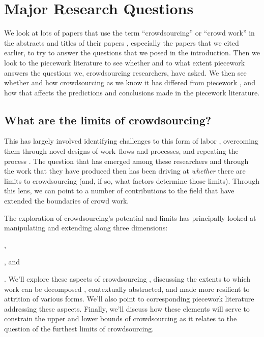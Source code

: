 \documentclass[trackingWork]{subfiles}
\begin{document}
\section{Major Research Questions}



We look at lots of papers that use the term ``crowdsourcing'' or ``crowd work''
in the abstracts and titles of their papers%
, especially the papers that we cited earlier, to try
to answer the questions that we posed in the introduction.
Then we look to the piecework literature to see whether and to what extent
piecework answers the questions we, crowdsourcing researchers, have asked.
We then see whether and how crowdsourcing as we know it has differed from piecework%
, and how that affects the predictions and conclusions made in the piecework literature.


\subsection{What are the limits of crowdsourcing?}
This has largely involved
  identifying challenges to this form of labor%
,   overcoming them through novel designs of work--flows and processes, and
  repeating the process
\cite[e.g.][]{bernsteinSoylent,foundry,crowdForgeKittur}.
The question that has emerged
among these researchers and
through the work that they have produced then
has been driving at \textit{whether} there are limits to crowdsourcing
(and, if so, what factors determine those limits).
Through this lens, we can point to
a number of contributions to the field that have extended the boundaries of crowd work.

The exploration of crowdsourcing's potential and limits has principally looked at
manipulating and extending along three dimensions:
\begin{inlinelist}
  \item {}%
,   \item {}, and
  \item {}
\end{inlinelist}.
We'll explore these aspects of crowdsourcing%
, discussing the extents to which work can be
decomposed%
, contextually abstracted, and
made more resilient to attrition of various forms.
We'll also point to corresponding piecework literature addressing these aspects.
Finally, we'll discuss how these elements will serve
to constrain the upper and lower bounds of crowdsourcing as it relates
to the question of the furthest limits of crowdsourcing.
\end{document}
